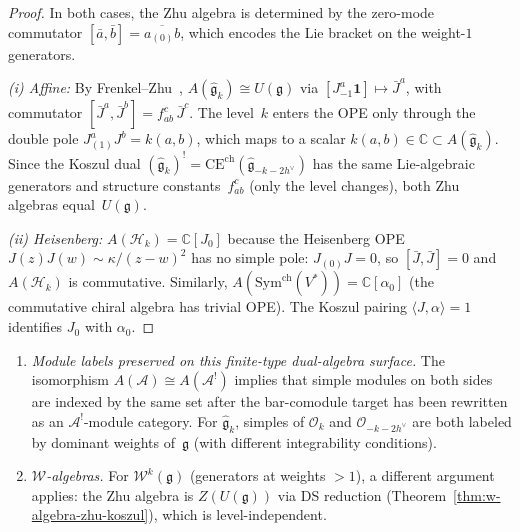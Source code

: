 \begin{proof}
In both cases, the Zhu algebra is determined by the zero-mode
commutator $[\bar{a}, \bar{b}] = \overline{a_{(0)}b}$, which
encodes the Lie bracket on the weight-$1$ generators.

\emph{(i) Affine:}
By Frenkel--Zhu~\cite{FZ92},
$A(\widehat{\mathfrak{g}}_k) \cong U(\mathfrak{g})$ via
$[J^a_{-1}\mathbf{1}] \mapsto \bar{J}^a$, with commutator
$[\bar{J}^a, \bar{J}^b] = f_{ab}^c\, \bar{J}^c$. The level~$k$
enters the OPE only through the double pole
$J^a_{(1)}J^b = k(a,b)$, which maps to a scalar
$k(a,b) \in \mathbb{C} \subset A(\widehat{\mathfrak{g}}_k)$.
Since the Koszul dual $(\widehat{\mathfrak{g}}_k)^!
= \mathrm{CE}^{\mathrm{ch}}(\widehat{\mathfrak{g}}_{-k-2h^\vee})$
has the same Lie-algebraic generators and
structure constants~$f_{ab}^c$ (only the level changes), both
Zhu algebras equal~$U(\mathfrak{g})$.

\emph{(ii) Heisenberg:}
$A(\mathcal{H}_k) = \mathbb{C}[J_0]$ because the Heisenberg
OPE $J(z)J(w) \sim \kappa/(z-w)^2$ has no simple pole:
$J_{(0)}J = 0$, so $[\bar{J}, \bar{J}] = 0$ and $A(\mathcal{H}_k)$
is commutative. Similarly,
$A(\mathrm{Sym}^{\mathrm{ch}}(V^*)) = \mathbb{C}[\alpha_0]$
(the commutative chiral algebra has trivial OPE). The Koszul pairing
$\langle J, \alpha \rangle = 1$ identifies $J_0$ with $\alpha_0$.
\end{proof}

\begin{remark}\label{rem:zhu-koszul-scope}
\leavevmode
\begin{enumerate}[label=(\roman*)]
\item \emph{Module labels preserved on this finite-type dual-algebra surface.}
The isomorphism $A(\mathcal{A}) \cong A(\mathcal{A}^!)$ implies that
simple modules on both sides are indexed by the same set after the
bar-comodule target has been rewritten as an $\mathcal{A}^!$-module
category. For $\widehat{\mathfrak{g}}_k$, simples of
$\mathcal{O}_k$ and $\mathcal{O}_{-k-2h^\vee}$ are both labeled by
dominant weights of~$\mathfrak{g}$ (with different integrability
conditions).
\item \emph{$\mathcal{W}$-algebras.} For $\mathcal{W}^k(\mathfrak{g})$ (generators at weights $> 1$), a different argument applies: the Zhu algebra is $Z(U(\mathfrak{g}))$ via DS reduction (Theorem~\ref{thm:w-algebra-zhu-koszul}), which is level-independent.
\end{enumerate}
\end{remark}

